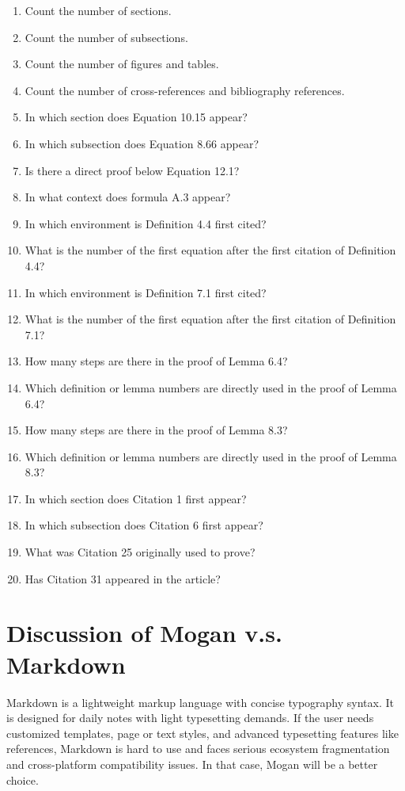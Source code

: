 \begin{enumerate}
    \item Count the number of sections.
    \item Count the number of subsections.
    \item Count the number of figures and tables.
    \item Count the number of cross-references and bibliography references.
    \item In which section does Equation 10.15 appear?
    \item In which subsection does Equation 8.66 appear?
    \item Is there a direct proof below Equation 12.1?
    \item In what context does formula A.3 appear?
    \item In which environment is Definition 4.4 first cited?
    \item What is the number of the first equation after the first citation of Definition 4.4?
    \item In which environment is Definition 7.1 first cited?
    \item What is the number of the first equation after the first citation of Definition 7.1?
    \item How many steps are there in the proof of Lemma 6.4?
    \item Which definition or lemma numbers are directly used in the proof of Lemma 6.4?
    \item How many steps are there in the proof of Lemma 8.3?
    \item Which definition or lemma numbers are directly used in the proof of Lemma 8.3?
    \item In which section does Citation 1 first appear?
    \item In which subsection does Citation 6 first appear?
    \item What was Citation 25 originally used to prove?
    \item Has Citation 31 appeared in the article?
\end{enumerate}

\section{Discussion of Mogan v.s. Markdown}
\label{app:vs}

Markdown is a lightweight markup language with concise typography syntax. It is designed for daily notes with light typesetting demands. If the user needs customized templates, page or text styles, and advanced typesetting features like references, Markdown is hard to use and faces serious ecosystem fragmentation and cross-platform compatibility issues. In that case, Mogan will be a better choice.


